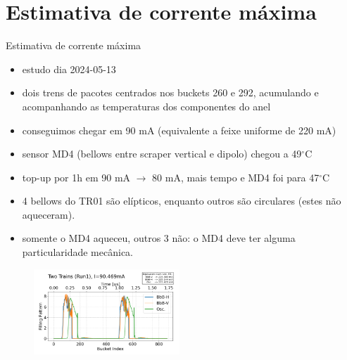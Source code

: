 \section{Estimativa de corrente máxima}



\begin{frame}{Estimativa de corrente máxima}

{\footnotesize
\begin{itemize}
    \item estudo dia 2024-05-13 \href{https://cnpemcamp.sharepoint.com/:b:/s/FAC/EYc5lGyqOatKoH_Rp2DNA1oBWygwBlE_1N8TA8AZYdNcBw?e=wTYFhx}{}
    \item dois trens de pacotes centrados nos buckets 260 e 292, acumulando e acompanhando as temperaturas dos componentes do anel
    \item conseguimos chegar em 90 mA (equivalente a feixe uniforme de 220 mA) 
    \item sensor MD4 (bellows entre scraper vertical e dipolo) chegou a 49$^\circ$C
    \item top-up por 1h em 90 mA $\rightarrow$ 80 mA, mais tempo e MD4 foi para 47$^\circ$C
    \item 4 bellows do TR01 são elípticos, enquanto outros são circulares (estes não aqueceram).
    \item somente o MD4 aqueceu, outros 3 não: o MD4 deve ter alguma particularidade mecânica.
\end{itemize}
}
\begin{figure}[ht]
    \centering
    \includegraphics[height=3.2cm]{2024-07-12/figures/filling-pattern.png}
\end{figure}
\end{frame}